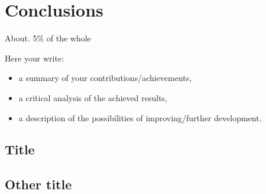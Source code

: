 \documentclass[12pt,a4paper,twoside]{report}
\begin{document}
\chapter{Conclusions}

About. 5\% of the whole

Here your write:
\begin{itemize}
\item a summary of your contributions/achievements,
\item a critical analysis of the achieved results,
\item a description of the possibilities of improving/further development.
\end{itemize}
\section{Title}
\section{Other title}


 



\end{document}
